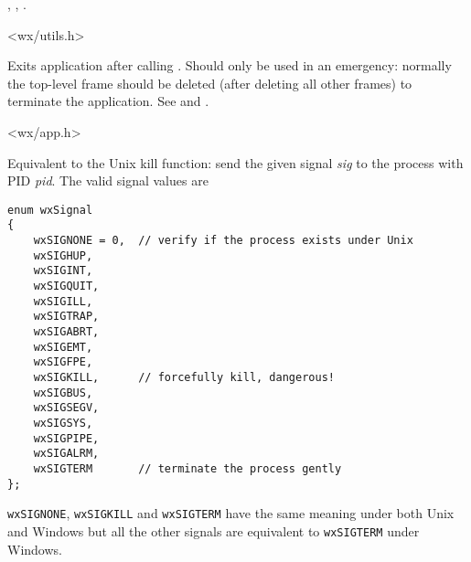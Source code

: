 
, , .







<wx/utils.h>


\label{wxexit}


Exits application after calling .
Should only be used in an emergency: normally the top-level frame
should be deleted (after deleting all other frames) to terminate the
application. See  and .


<wx/app.h>


\label{wxkill}


Equivalent to the Unix kill function: send the given signal {\it sig} to the
process with PID {\it pid}. The valid signal values are

\begin{verbatim}
enum wxSignal
{
    wxSIGNONE = 0,  // verify if the process exists under Unix
    wxSIGHUP,
    wxSIGINT,
    wxSIGQUIT,
    wxSIGILL,
    wxSIGTRAP,
    wxSIGABRT,
    wxSIGEMT,
    wxSIGFPE,
    wxSIGKILL,      // forcefully kill, dangerous!
    wxSIGBUS,
    wxSIGSEGV,
    wxSIGSYS,
    wxSIGPIPE,
    wxSIGALRM,
    wxSIGTERM       // terminate the process gently
};
\end{verbatim}

{\tt wxSIGNONE}, {\tt wxSIGKILL} and {\tt wxSIGTERM} have the same meaning
under both Unix and Windows but all the other signals are equivalent to 
{\tt wxSIGTERM} under Windows.

